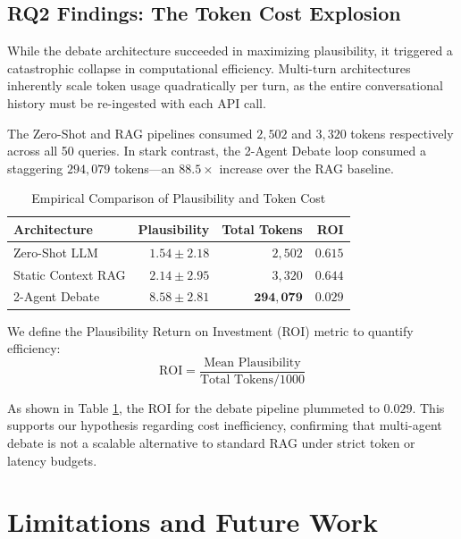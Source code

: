 \documentclass[11pt, conference, onecolumn]{IEEEtran}
\begin{document}
\subsection{RQ2 Findings: The Token Cost Explosion}
While the debate architecture succeeded in maximizing plausibility, it triggered a catastrophic collapse in computational efficiency. Multi-turn architectures inherently scale token usage quadratically per turn, as the entire conversational history must be re-ingested with each API call.

The Zero-Shot and RAG pipelines consumed $2,502$ and $3,320$ tokens respectively across all 50 queries. In stark contrast, the 2-Agent Debate loop consumed a staggering $294,079$ tokens---an $88.5\times$ increase over the RAG baseline. 

\begin{table}[h]
\centering
\caption{Empirical Comparison of Plausibility and Token Cost}
\label{tab:results}
\begin{tabularx}{\columnwidth}{l r r r}
\toprule
\textbf{Architecture} & \textbf{Plausibility} & \textbf{Total Tokens} & \textbf{ROI} \\
\midrule
Zero-Shot LLM & $1.54 \pm 2.18$ & $2,502$ & $0.615$ \\
Static Context RAG & $2.14 \pm 2.95$ & $3,320$ & $0.644$ \\
2-Agent Debate & $\mathbf{8.58} \pm 2.81$ & $\mathbf{294,079}$ & $\mathbf{0.029}$ \\
\bottomrule
\end{tabularx}
\end{table}

We define the Plausibility Return on Investment (ROI) metric to quantify efficiency:
\begin{equation}
\text{ROI} = \frac{\text{Mean Plausibility}}{\text{Total Tokens} / 1000}
\end{equation}

As shown in Table \ref{tab:results}, the ROI for the debate pipeline plummeted to $0.029$. This supports our hypothesis regarding cost inefficiency, confirming that multi-agent debate is not a scalable alternative to standard RAG under strict token or latency budgets.

\section{Limitations and Future Work}
\end{document}
